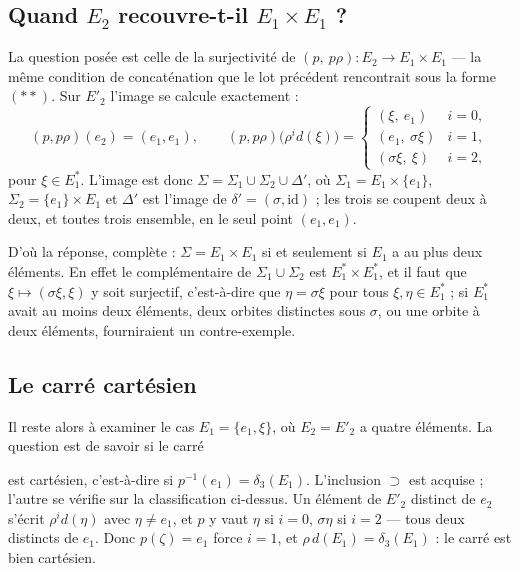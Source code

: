 \documentclass[11pt,a4paper]{article}
\begin{document}
\subsection*{Quand $E_{2}$ recouvre-t-il $E_{1} \times E_{1}$ ?}

La question posée est celle de la surjectivité de
$(p,\ p\rho) \colon E_{2} \to E_{1} \times E_{1}$ — la même condition de
concaténation que le lot précédent rencontrait sous la forme $(**)$. Sur
$E'_{2}$ l'image se calcule exactement :
\[
  (p, p\rho)(e_{2}) = (e_{1},e_{1}), \qquad
  (p, p\rho)\bigl(\rho^{i}d(\xi)\bigr) =
  \begin{cases}
    (\xi,\ e_{1}) & i = 0, \\
    (e_{1},\ \sigma\xi) & i = 1, \\
    (\sigma\xi,\ \xi) & i = 2,
  \end{cases}
\]
pour $\xi \in E^{*}_{1}$. L'image est donc
$\Sigma = \Sigma_{1} \cup \Sigma_{2} \cup \Delta'$, où $\Sigma_{1} = E_{1}
\times \{e_{1}\}$, $\Sigma_{2} = \{e_{1}\} \times E_{1}$ et $\Delta'$ est
l'image de $\delta' = (\sigma, \mathrm{id})$ ; les trois se coupent deux à deux,
et toutes trois ensemble, en le seul point $(e_{1},e_{1})$.

D'où la réponse, complète : $\Sigma = E_{1} \times E_{1}$ si et seulement si
$E_{1}$ a au plus deux éléments. En effet le complémentaire de
$\Sigma_{1} \cup \Sigma_{2}$ est $E^{*}_{1} \times E^{*}_{1}$, et il faut que
$\xi \mapsto (\sigma\xi,\xi)$ y soit surjectif, c'est-à-dire que
$\eta = \sigma\xi$ pour tous $\xi,\eta \in E^{*}_{1}$ ; si $E^{*}_{1}$ avait au
moins deux éléments, deux orbites distinctes sous $\sigma$, ou une orbite à deux
éléments, fourniraient un contre-exemple.

\subsection*{Le carré cartésien}

Il reste alors à examiner le cas $E_{1} = \{e_{1},\xi\}$, où $E_{2} = E'_{2}$ a
quatre éléments. La question est de savoir si le carré
est cartésien, c'est-à-dire si $p^{-1}(e_{1}) = \delta_{3}(E_{1})$. L'inclusion
$\supset$ est acquise ; l'autre se vérifie sur la classification ci-dessus. Un
élément de $E'_{2}$ distinct de $e_{2}$ s'écrit $\rho^{i}d(\eta)$ avec
$\eta \neq e_{1}$, et $p$ y vaut $\eta$ si $i = 0$, $\sigma\eta$ si $i = 2$ —
tous deux distincts de $e_{1}$. Donc $p(\zeta) = e_{1}$ force $i = 1$, et
$\rho\,d(E_{1}) = \delta_{3}(E_{1})$ : le carré est bien cartésien.
\end{document}
